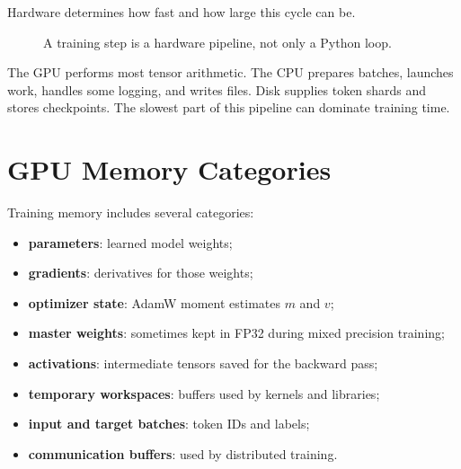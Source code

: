Hardware determines how fast and how large this cycle can be.

\begin{figure}[htbp]
\centering
{}
\caption{A training step is a hardware pipeline, not only a Python loop.}
\end{figure}

The GPU performs most tensor arithmetic. The CPU prepares batches, launches work, handles
some logging, and writes files. Disk supplies token shards and stores checkpoints. The
slowest part of this pipeline can dominate training time.

\section{GPU Memory Categories}

Training memory includes several categories:

\begin{itemize}
  \item \textbf{parameters}: learned model weights;
  \item \textbf{gradients}: derivatives for those weights;
  \item \textbf{optimizer state}: AdamW moment estimates \(m\) and \(v\);
  \item \textbf{master weights}: sometimes kept in FP32 during mixed precision training;
  \item \textbf{activations}: intermediate tensors saved for the backward pass;
  \item \textbf{temporary workspaces}: buffers used by kernels and libraries;
  \item \textbf{input and target batches}: token IDs and labels;
  \item \textbf{communication buffers}: used by distributed training.
\end{itemize}

